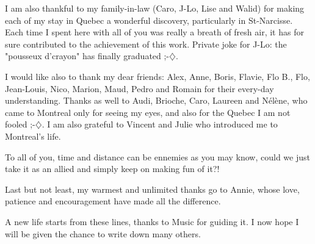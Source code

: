 \documentclass[twoside, a4paper, 12pt]{book}
\renewcommand{\headrulewidth}{0pt}
\begin{document}
{I am also thankful to my family-in-law (Caro, J-Lo, Lise and Walid) for making each of my stay in Quebec a wonderful discovery, particularly in St-Narcisse. Each time I spent here with all of you was really a breath of fresh air, it has for sure contributed to the achievement of this work. Private joke for J-Lo: the "pousseux d'crayon" has finally graduated ;-$\diamondsuit$.\\

\vspace{0.25cm}

I would like also to thank my dear friends: Alex, Anne, Boris, Flavie, Flo B., Flo, Jean-Louis, Nico, Marion, Maud, Pedro and Romain for their every-day understanding. Thanks as well to Audi, Brioche, Caro, Laureen and N{\'e}l{\`e}ne, who came to Montreal only for seeing my eyes, and also for the Quebec I am not fooled ;-$\diamondsuit$. I am also grateful to Vincent and Julie who introduced me to Montreal's life.\\

\vspace{0.25cm}

To all of you, time and distance can be ennemies as you may know, could we just take it as an allied and simply keep on making fun of it?!\\

\vspace{0.25cm}

Last but not least, my warmest and unlimited thanks go to Annie, whose love, patience and encouragement have made all the difference.

\vspace{0.5cm}
\noindent{------}
\vspace{0.5cm}

A new life starts from these lines, thanks to Music for guiding it. I now hope I will be given the chance to write down many others.
}
\makeAcknowledgments
\newpage\vfill~\newpage
\cleardoublepage

\fancyhead[RE, LO]{} 
\renewcommand{\headrulewidth}{0.4pt}
\setcounter{page}{1}
{}
\renewcommand\contentsname{Table of Contents}
\tableofcontents

\fancyhead[RO]{\slshape \rightmark} 
\fancyhead[LE]{\slshape \leftmark}
\fancyhead[LO, RE]{} 







\end{document}
